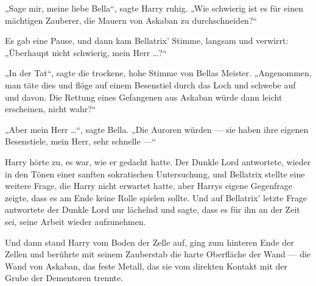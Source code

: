„Sage mir, meine liebe Bella“, sagte Harry ruhig.
„Wie schwierig ist es für einen mächtigen Zauberer, die Mauern von Askaban zu durchschneiden?“

Es gab eine Pause, und dann kam Bellatrix’ Stimme, langsam und verwirrt: „Überhaupt nicht schwierig, mein Herr …?“

„In der Tat“, sagte die trockene, hohe Stimme von Bellas Meister.
„Angenommen, man täte dies und flöge auf einem Besenstiel durch das Loch und schwebe auf und davon. Die Rettung eines Gefangenen aus Askaban würde dann leicht erscheinen, nicht wahr?“

„Aber mein Herr …“, sagte Bella.
„Die Auroren würden — sie haben ihre eigenen Besenstiele, mein Herr, sehr schnelle —“

Harry hörte zu, es war, wie er gedacht hatte. Der Dunkle Lord antwortete, wieder in den Tönen einer sanften sokratischen Untersuchung, und Bellatrix stellte eine weitere Frage, die Harry nicht erwartet hatte, aber Harrys eigene Gegenfrage zeigte, dass es am Ende keine Rolle spielen sollte. Und auf Bellatrix’ letzte Frage antwortete der Dunkle Lord nur lächelnd und sagte, dass es für ihn an der Zeit sei, seine Arbeit wieder aufzunehmen.

Und dann stand Harry vom Boden der Zelle auf, ging zum hinteren Ende der Zellen und berührte mit seinem Zauberstab die harte Oberfläche der Wand — die Wand von Askaban, das feste Metall, das sie vom direkten Kontakt mit der Grube der Dementoren trennte.

